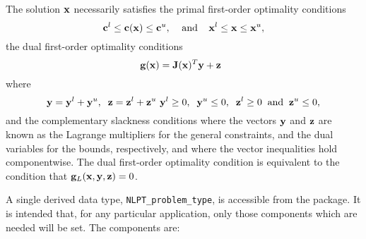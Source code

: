 \documentclass{galahad}
\newcommand{\packagename}{NLPT}
\begin{document}
The solution ${\mathbf{x}}$ necessarily satisfies 
the primal first-order optimality conditions
\[
{\mathbf{c}}^l \leq {\mathbf{c}}({\mathbf{x}}) \leq {\mathbf{c}}^u,
\;\;\;\; \mbox{and} \;\;\;\;
{\mathbf{x}}^l \leq {\mathbf{x}} \leq {\mathbf{x}}^u,
\]
the dual first-order optimality conditions
\[
{\mathbf{g}}( {\mathbf{x}} ) = {\mathbf{J}}({\mathbf{x}})^{T} {\mathbf{y}} + {\mathbf{z}} \;\;
\]
where
\[
{\mathbf{y}} = {\mathbf{y}}^{l} + {\mathbf{y}}^{u}, \;\;
 {\mathbf{z}} = {\mathbf{z}}^{l} + {\mathbf{z}}^{u}\,\,
 {\mathbf{y}}^{l} \geq 0 , \;\;
 {\mathbf{y}}^{u} \leq 0 , \;\;
 {\mathbf{z}}^{l} \geq 0 \;\; \mbox{and} \;\;
 {\mathbf{z}}^{u} \leq 0 ,
\]
and the complementary slackness conditions 
where the vectors ${\mathbf{y}}$ and ${\mathbf{z}}$ are 
known as the Lagrange multipliers for
the general constraints, and the dual variables for the bounds,
respectively, and where the vector inequalities hold componentwise.
The dual first-order optimality condition is equivalent to
the condition that ${\mathbf{g}}_L( {\mathbf{x}},{\mathbf{y}}, {\mathbf{z}}) = 0$.





\galtype
A single derived data type, {\tt \packagename\_problem\_type},
is accessible from the package. It is intended that, for any particular
application, only those components which are needed will be set.
The components are:
\end{document}

